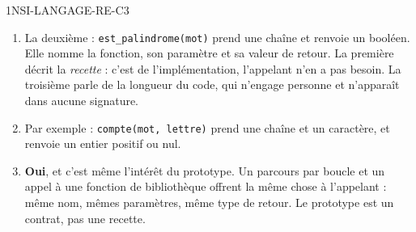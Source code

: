 \begin{corrige}{1NSI-LANGAGE-RE-C3}
\begin{enumerate}
  \item La deuxième : \lstinline{est_palindrome(mot)} prend une chaîne et renvoie un booléen.
        Elle nomme la fonction, son paramètre et sa valeur de retour.
        La première décrit la \emph{recette} : c'est de l'implémentation, l'appelant n'en a pas
        besoin. La troisième parle de la longueur du code, qui n'engage personne et n'apparaît
        dans aucune signature.
  \item Par exemple : \lstinline{compte(mot, lettre)} prend une chaîne et un caractère, et
        renvoie un entier positif ou nul.
  \item \textbf{Oui}, et c'est même l'intérêt du prototype. Un parcours par boucle et un
        appel à une fonction de bibliothèque offrent la même chose à l'appelant : même nom,
        mêmes paramètres, même type de retour. Le prototype est un contrat, pas une recette.
\end{enumerate}
\end{corrige}
